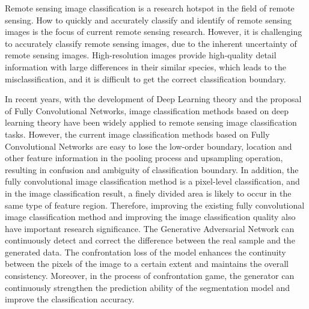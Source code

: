 
\begin{eabstract}
  Remote sensing image classification is a research hotspot in the field of remote sensing. How to quickly and accurately classify and identify  of remote sensing images is the focus of current remote sensing research. However, it is challenging to accurately classify remote sensing images, due to the inherent uncertainty of remote sensing images. High-resolution images provide high-quality detail information with large differences in their similar species, which leads to the misclassification, and it is difficult to get the correct classification boundary.

  In recent years, with the development of Deep Learning theory and the proposal of Fully Convolutional Networks, image classification methods based on deep learning theory have been widely applied to remote sensing image classification tasks. However, the current image classification methods based on Fully Convolutional Networks are easy to lose the low-order boundary, location and other feature information in the pooling process and upsampling operation, resulting in confusion and ambiguity of classification boundary. In addition, the fully convolutional image classification method is a pixel-level classification, and in the image classification result, a finely divided area is likely to occur in the same type of feature region. Therefore, improving the existing fully convolutional image classification method and improving the image classification quality also have important research significance. The Generative Adversarial Network can continuously detect and correct the difference between the real sample and the generated data. The confrontation loss of the model enhances the continuity between the pixels of the image to a certain extent and maintains the overall consistency. Moreover, in the process of confrontation game, the generator can continuously strengthen the prediction ability of the segmentation model and improve the classification accuracy.  
  

\end{eabstract}
